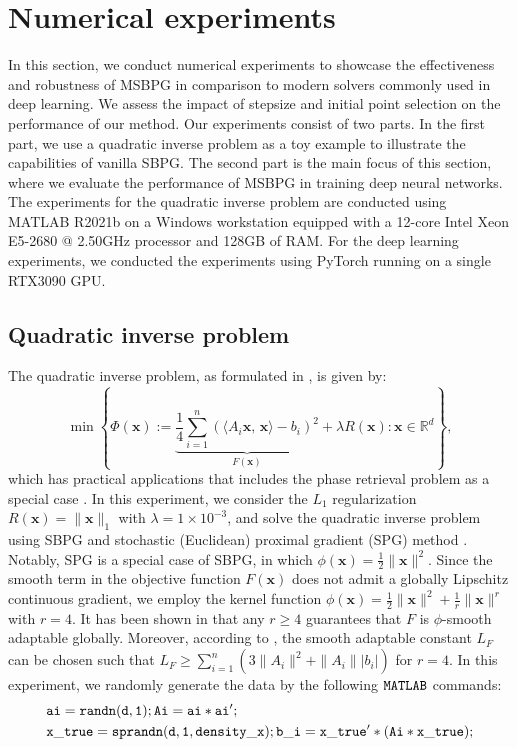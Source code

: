 \documentclass[twoside,11pt]{article}
\newcommand{\R}{\mathbb R}
\def\inprod#1#2{\langle#1,\,#2\rangle}
\def\vx{{\bm{x}}}
\begin{document}
\section{Numerical experiments}\label{section-experiments}
In this section, we conduct numerical experiments to showcase the effectiveness and robustness of  MSBPG in comparison to modern solvers commonly used in deep learning. We assess the impact of stepsize and initial point selection on the performance of our method. Our experiments consist of two parts. In the first part, we use a quadratic inverse problem as a toy example to illustrate the capabilities of vanilla SBPG. The second part is the main focus of this section, where we evaluate the performance of MSBPG in training deep neural networks. The experiments for the quadratic inverse problem are conducted using MATLAB R2021b on a Windows workstation equipped with a 12-core Intel Xeon E5-2680 @ 2.50GHz processor and 128GB of RAM. For the deep learning experiments, we conducted the experiments using PyTorch running on a single RTX3090 GPU.

\subsection{Quadratic inverse problem}
The quadratic inverse problem, as formulated in \cite{bolte2018first}, is given by:
\[
\min\left\{\Phi(\vx):=\underbrace{\frac{1}{4}\sum_{i=1}^n(\inprod{A_i\vx}{\vx}-b_i)^2}_{F(\vx)}+\lambda R(\vx): \vx\in\R^d\right\},
\]
which has {practical applications \citep{beck2013sparsity} that} includes the phase retrieval problem as a special case \citep{luke2017phase}. In this experiment, we consider the $L_1$ regularization $R(\vx)=\|\vx\|_1$ with $\lambda=1\times10^{-3}$, and solve the quadratic inverse problem using SBPG and stochastic {(Euclidean)} proximal gradient (SPG) method \citep{bertsekas2011incremental}. Notably, SPG is a special case of SBPG, in which $\phi(\vx)=\frac{1}{2}\|\vx\|^2$. Since the smooth term in the objective function $F(\vx)$ does not admit a globally Lipschitz continuous gradient, we employ the kernel function $\phi(\vx)=\frac{1}{2}\|\vx\|^2+\frac{1}{r}\|\vx\|^r$ with $r=4$. It has been shown in \cite{lu2018relatively} that any $r\geq4$ guarantees that $F$ is $\phi$-smooth adaptable globally. Moreover, according to \cite{bolte2018first}, the smooth adaptable constant $L_F$ can be chosen such that $L_F\geq\sum_{i=1}^n(3\|A_i\|^2+\|A_i\||b_i|)$ for $r=4$. In this experiment, we randomly generate the data by the following ${\tt MATLAB}$ commands: 
\[
\begin{aligned}
&{\tt ai = randn(d,1);Ai = ai*ai';}\\
&{\tt x\_true = sprandn(d,1,density\_x); b\_i = x\_true'*(Ai*x\_true);}
\end{aligned}
\]
\end{document}
